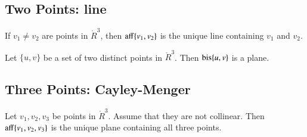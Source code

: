 \begin{tarskidata}
\begin{tarski}
\section{Two Points: line}

\begin{lemma}
	If $v_1\ne v_2$ are points in $\ring{R}^3$, then ${\operatorname{aff}}\{v_1,v_2\}$ is the unique
line containing $v_1$ and $v_2$.
\end{lemma}

\begin{proved}
\swallowed\end{proved}
\end{tarski}





\begin{tarski}

\begin{lemma}
Let $\{u,v\}$ be a set of two distinct points in 
$\ring{R}^3$.  Then ${\operatorname{bis}}\{u,v\}$ is a plane.
\end{lemma}

\begin{proved}
\swallowed\end{proved}
\end{tarski}






\begin{tarski}
\section{Three Points: Cayley-Menger}

\begin{lemma}
	Let $v_1,v_2,v_3$ be points in $\ring{R}^3$.  Assume that they are not collinear.
Then ${\operatorname{aff}}\{v_1,v_2,v_3\}$ is the unique plane containing all three points.
\end{lemma}


\end{tarski}
\end{tarskidata}
